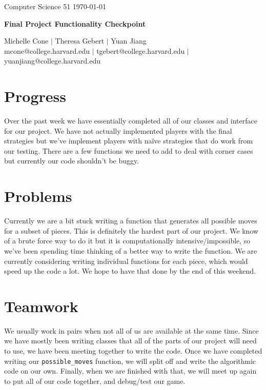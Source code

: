 \documentclass[11pt]{article}
\begin{document}
\doublespacing

\noindent Computer Science 51 \hfill \today\\
\noindent\makebox[\linewidth]{\rule{6.5in}{2.0pt}}

\begin{center}

{{\LARGE \bf Final Project Functionality Checkpoint}} \\
\vspace{3mm}
{{\LARGE \bf }}

\noindent\makebox[\linewidth]{\rule{6.5in}{2.0pt}}

\vspace{3mm}

{\large Michelle Cone $|$ Theresa Gebert $|$ Yuan Jiang \\
\normalsize mcone@college.harvard.edu $|$ tgebert@college.harvard.edu $|$ yuanjiang@college.harvard.edu} \\

\end{center}


\vspace{2mm}

\section{Progress}
Over the past week we have essentially completed all of our classes and interface for our project. We have not actually implemented players with the final strategies but we've implement players with na{\"i}ve strategies that do work from our testing. There are a few functions we need to add to deal with corner cases but currently our code shouldn't be buggy. 
\section{Problems}
Currently we are a bit stuck writing a function that generates all possible moves for a subset of pieces. This is definitely the hardest part of our project. We know of a brute force way to do it but it is computationally intensive/impossible, so we've been spending time thinking of a better way to write the function. We are currently considering writing individual functions for each piece, which would speed up the code a lot. We hope to have that done by the end of this weekend.  
\section{Teamwork}
We usually work in pairs when not all of us are available at the same time. Since we have mostly been writing classes that all of the parts of our project will need to use, we have been meeting together to write the code. Once we have completed writing our \texttt{possible\_moves} function, we will split off and write the algorithmic code on our own. Finally, when we are finished with that, we will meet up again to put all of our code together, and debug/test our game. 
\end{document}

